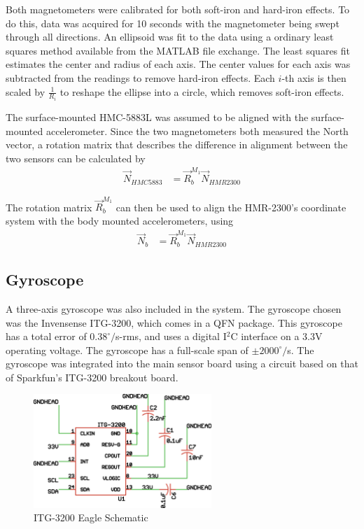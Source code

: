  Both magnetometers were calibrated for both soft-iron and hard-iron effects\cite{magCalibration}. To do this, data was acquired for 10 seconds with the magnetometer being swept through all directions. An ellipsoid was fit to the data using a ordinary least squares method available from the MATLAB file exchange\cite{ellipsoidFit}.
 The least squares fit estimates the center and radius of each axis. The center values for each axis was subtracted from the readings to remove hard-iron effects. Each $i$-th axis is then scaled by $\frac{1}{R_i}$ to reshape the ellipse into a circle, which removes soft-iron effects.
 
 The surface-mounted HMC-5883L was assumed to be aligned with the surface-mounted accelerometer. Since the two magnetometers both measured the North vector, a rotation matrix that describes the difference in alignment between the two sensors can be calculated by
 \begin{align}
\vec{N}_{HMC5883} &= \vec{R}^{M_1}_b\vec{N}_{HMR2300}
 \end{align}
 
 The rotation matrix $\vec{R}^{M_1}_b$ can then be used to align the HMR-2300's coordinate system with the body mounted accelerometers, using
 \begin{align}
\vec{N}_b &= \vec{R}^{M_1}_b\vec{N}_{HMR2300}
 \end{align}
 
\subsection*{Gyroscope}
A three-axis gyroscope was also included in the system. The gyroscope chosen was the Invensense ITG-3200, which comes in a QFN package. This gyroscope has a total error of $0.38^\circ/$s-rms\cite{itg3200DataSheet}, and uses a digital I$^2$C interface on a 3.3V operating voltage. The gyroscope has a full-scale span of $\pm2000^\circ/$s. The gyroscope was integrated into the main sensor board using a circuit based on that of Sparkfun's ITG-3200 breakout board\cite{itg3200BOBSchematic}.

\begin{figure}[H]

  \centering
    \includegraphics[width=0.6\textwidth]{figures/itg3200Schematic.eps}
      \caption{ITG-3200 Eagle Schematic} \label{itg3200Schematic}
\end{figure}

